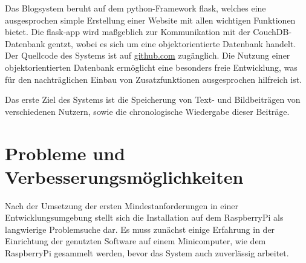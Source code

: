 Das Blogsystem beruht auf dem python-Framework flask, welches eine
ausgesprochen simple Erstellung einer Website mit allen wichtigen Funktionen
bietet.
Die flask-app wird maßgeblich zur Kommunikation mit der CouchDB-Datenbank
gentzt, wobei es sich um eine objektorientierte Datenbank handelt.
Der Quellcode des Systems ist auf
\href{https://github.com/bixel/microblog}{github.com} zugänglich.
Die Nutzung einer objektorientierten Datenbank ermöglicht eine besonders
freie Entwicklung, was für den nachträglichen Einbau von Zusatzfunktionen
ausgesprochen hilfreich ist.

Das erste Ziel des Systems ist die Speicherung von Text- und Bildbeiträgen
von verschiedenen Nutzern, sowie die chronologische Wiedergabe dieser Beiträge.

\section{Probleme und Verbesserungsmöglichkeiten}
Nach der Umsetzung der ersten Mindestanforderungen in einer
Entwicklungsumgebung stellt sich die Installation auf dem RaspberryPi als
langwierige Problemsuche dar.
Es muss zunächst einige Erfahrung in der Einrichtung der genutzten Software auf
einem Minicomputer, wie dem RaspberryPi gesammelt werden, bevor das System auch
zuverlässig arbeitet.

